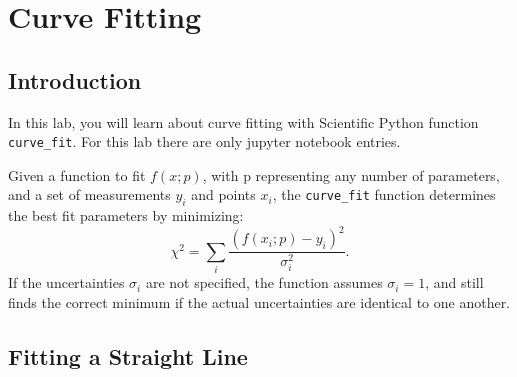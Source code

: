 \chapter{Curve Fitting}
\section{Introduction}

In this lab, you will learn about curve fitting with Scientific Python
function {\tt curve{\_}fit}.  For this lab there are only jupyter notebook entries. 

Given a function to fit $f(x;p)$, with p
representing any number of parameters, and a set of measurements $y_i$ and points $x_i$,
the {\tt curve{\_}fit} function determines the best fit parameters by
minimizing:
\begin{equation}
\chi^2 = \sum_i \frac{(f(x_i;p) - y_i) ^2}{\sigma_i^2}.
\label{eqn:chi2}
\end{equation}
If the uncertainties $\sigma_i$ are not specified, the function
assumes $\sigma_i = 1$, and still finds the correct minimum
if the actual uncertainties are identical to one another.

\section{Fitting a Straight Line}

